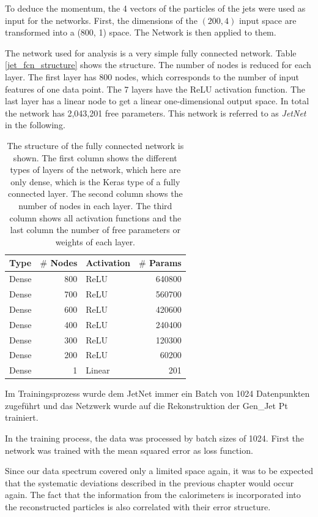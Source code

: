 \documentclass[12pt, a4paper]{thesis}
\begin{document}
To deduce the momentum, the 4 vectors of the particles of the jets
were used as input for the networks. First, the dimensions of the
\((200, 4)\) input space are transformed into a (800, 1) space. The Network
is then applied to them.

The network used for analysis is a very simple fully connected
network.  Table \ref{jet_fcn_structure} shows the structure. The number
of nodes is reduced for each layer.  The first layer has 800 nodes,
which corresponds to the number of input features of one data
point. The 7 layers have the ReLU activation function. The last layer
has a linear node to get a linear one-dimensional output space. In
total the network has 2,043,201 free parameters. This network is
referred to as \emph{JetNet} in the following.

\begin{table}[htbp]
\caption{\label{tab:org5acaf02}
The structure of the fully connected network is shown. The first column shows the different types of layers of the network, which here are only dense, which is the Keras type of a fully connected layer. The second column shows the number of nodes in each layer. The third column shows all activation functions and the last column the number of free parameters or weights of each layer.}
\centering
\begin{tabular}{lrlr}
Type & \(\#\) Nodes & Activation & \(\#\) Params\\
\hline
Dense & 800 & ReLU & 640800\\
Dense & 700 & ReLU & 560700\\
Dense & 600 & ReLU & 420600\\
Dense & 400 & ReLU & 240400\\
Dense & 300 & ReLU & 120300\\
Dense & 200 & ReLU & 60200\\
Dense & 1 & Linear & 201\\
\end{tabular}
\end{table}

Im Trainingsprozess wurde dem JetNet immer ein Batch von 1024
Datenpunkten zugeführt und das Netzwerk wurde auf die Rekonstruktion
der Gen\_Jet Pt trainiert.

In the training process, the data was processed by batch sizes
of 1024. First the network was trained with the mean squared error as
loss function.

Since our data spectrum covered only a limited space again, it was to
be expected that the systematic deviations described in the previous
chapter would occur again. The fact that the information from the
calorimeters is incorporated into the reconstructed particles is also
correlated with their error structure.
\end{document}
